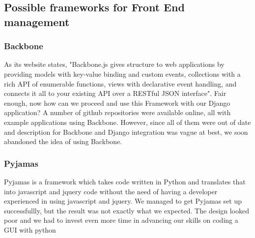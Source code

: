 \documentclass{l3proj}
\begin{document}
{\subsection{Possible frameworks for Front End management}
\subsubsection{Backbone}
As its website states, "Backbone.js gives structure to web applications by providing 
models with key-value binding and custom events, collections with a rich API of 
enumerable functions, views with declarative event handling, and connects it all to 
your existing API over a RESTful JSON interface". Fair enough, now how can we 
proceed and use this Framework with our Django application? A number of github 
repositories were available online, all with example applications using Backbone. 
However, since all of them were out of date and description for Backbone and 
Django integration was vague at best, we soon abandoned the idea of using 
Backbone. 
\subsubsection{Pyjamas}
Pyjamas is a framework which takes code written in Python and translates that 
into javascript and jquery code without the need of having a developer experienced 
in using javascript and jquery. We managed to get Pyjamas set up successfullly, 
but the result was not exactly what we expected. The design looked poor and we 
had to invest even more time in advancing our skills on coding a GUI with python
}
\end{document}
